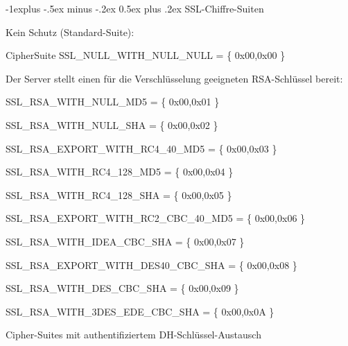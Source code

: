 \documentclass[a4paper]{article}
\makeatletter
\renewcommand{\subsection}{\@startsection{subsection}{2}{0mm}%
 {-1explus -.5ex minus -.2ex}%
 {0.5ex plus .2ex}%
 {\normalfont\normalsize\bfseries}}
\makeatother
\begin{document}
\begin{multicols}{3}
\begin{itemize*}
            \subsection{SSL-Chiffre-Suiten}

            \begin{itemize*}
                  \item
                  Kein Schutz (Standard-Suite):

                  \begin{itemize*}
                        \item CipherSuite SSL\_NULL\_WITH\_NULL\_NULL = \{ 0x00,0x00 \}
                  \end{itemize*}
                  \item
                  Der Server stellt einen für die Verschlüsselung geeigneten
                  RSA-Schlüssel bereit:

                  \begin{itemize*}
                        \item SSL\_RSA\_WITH\_NULL\_MD5 = \{ 0x00,0x01 \}
                        \item SSL\_RSA\_WITH\_NULL\_SHA = \{ 0x00,0x02 \}
                        \item SSL\_RSA\_EXPORT\_WITH\_RC4\_40\_MD5 = \{ 0x00,0x03 \}
                        \item SSL\_RSA\_WITH\_RC4\_128\_MD5 = \{ 0x00,0x04 \}
                        \item SSL\_RSA\_WITH\_RC4\_128\_SHA = \{ 0x00,0x05 \}
                        \item SSL\_RSA\_EXPORT\_WITH\_RC2\_CBC\_40\_MD5 = \{ 0x00,0x06 \}
                        \item SSL\_RSA\_WITH\_IDEA\_CBC\_SHA = \{ 0x00,0x07 \}
                        \item SSL\_RSA\_EXPORT\_WITH\_DES40\_CBC\_SHA = \{ 0x00,0x08 \}
                        \item SSL\_RSA\_WITH\_DES\_CBC\_SHA = \{ 0x00,0x09 \}
                        \item SSL\_RSA\_WITH\_3DES\_EDE\_CBC\_SHA = \{ 0x00,0x0A \}
                  \end{itemize*}
                  \item
                  Cipher-Suites mit authentifiziertem DH-Schlüssel-Austausch


\end{itemize*}
\end{itemize*}
\end{multicols}
\end{document}
